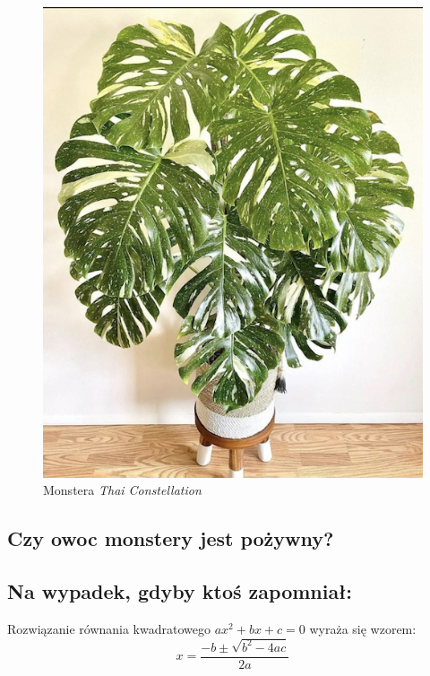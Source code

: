 \begin{figure}[hbt!]
\begin{minipage}{0.5\textwidth}
        \includegraphics[width=\linewidth]{pictures/monsterathaiconst.png}
        \caption{Monstera \emph{Thai Constellation}}
    \end{minipage}
\end{figure}

\subsection{Czy owoc monstery jest pożywny?}



\subsection{Na wypadek, gdyby ktoś zapomniał:}
Rozwiązanie równania kwadratowego $ax^2 + bx + c = 0$ wyraża się wzorem:
\[ x = \frac{{-b \pm \sqrt{{b^2-4ac}}}}{{2a}} \]